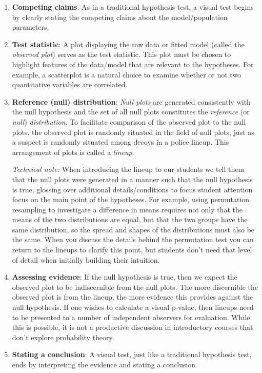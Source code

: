 \documentclass[12pt]{article}
\begin{document}
\begin{enumerate}
\def\labelenumi{\arabic{enumi}.}
\item
  \textbf{Competing claims}: As in a traditional hypothesis test, a
  visual test begins by clearly stating the competing claims about the
  model/population parameters.
\item
  \textbf{Test statistic}: A plot displaying the raw data or fitted
  model (called the \emph{observed plot}) serves as the test statistic.
  This plot must be chosen to highlight features of the data/model that
  are relevant to the hypotheses. For example, a scatterplot is a
  natural choice to examine whether or not two quantitative variables
  are correlated.
\item
  \textbf{Reference (null) distribution}: \emph{Null plots} are
  generated consistently with the null hypothesis and the set of all
  null plots constitutes the \emph{reference} (or \emph{null})
  \emph{distribution}. To facilitate comparison of the observed plot to
  the null plots, the observed plot is randomly situated in the field of
  null plots, just as a suspect is randomly situated among decoys in a
  police lineup. This arrangement of plots is called a \emph{lineup}.

  \emph{Technical note:} When introducing the lineup to our students we
  tell them that the null plots were generated in a manner such that the
  null hypothesis is true, glossing over additional details/conditions
  to focus student attention focus on the main point of the hypotheses.
  For example, using permutation resampling to investigate a difference
  in means requires not only that the means of the two distributions are
  equal, but that the two groups have the same distribution, so the
  spread and shapes of the distributions must also be the same. When you
  discuss the details behind the permutation test you can return to the
  lineups to clarify this point, but students don't need that level of
  detail when initially building their intuition.
\item
  \textbf{Assessing evidence}: If the null hypothesis is true, then we
  expect the observed plot to be indiscernible from the null plots. The
  more discernible the observed plot is from the lineup, the more
  evidence this provides against the null hypothesis. If one wishes to
  calculate a visual p-value, then lineups need to be presented to a
  number of independent observers for evaluation. While this is
  possible, it is not a productive discussion in introductory courses
  that don't explore probability theory.
\item
  \textbf{Stating a conclusion}: A visual test, just like a traditional
  hypothesis test, ends by interpreting the evidence and stating a
  conclusion.
\end{enumerate}
\end{document}
